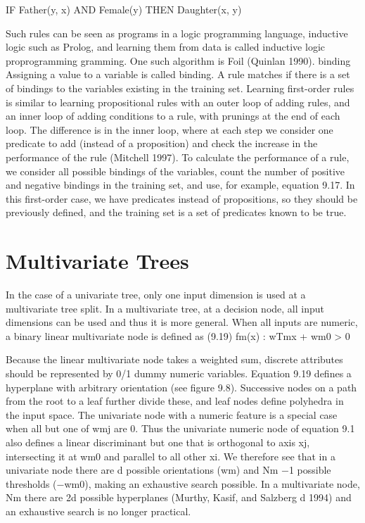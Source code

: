 IF Father(y, x) AND Female(y) THEN Daughter(x, y)

Such rules can be seen as programs in a logic programming language, inductive logic such as Prolog, and learning them from data is called inductive logic proprogramming gramming. One such algorithm is Foil (Quinlan 1990). binding Assigning a value to a variable is called binding. A rule matches if there is a set of bindings to the variables existing in the training set. Learning first-order rules is similar to learning propositional rules with an outer loop of adding rules, and an inner loop of adding conditions to a rule, with prunings at the end of each loop. The difference is in the inner loop, where at each step we consider one predicate to add (instead of a proposition) and check the increase in the performance of the rule (Mitchell 1997). To calculate the performance of a rule, we consider all possible bindings of the variables, count the number of positive and negative bindings in the training set, and use, for example, equation 9.17. In this first-order case, we have predicates instead of propositions, so they should be previously defined, and the training set is a set of predicates known to be true.

\section{Multivariate Trees}

In the case of a univariate tree, only one input dimension is used at a multivariate tree split. In a multivariate tree, at a decision node, all input dimensions can be used and thus it is more general. When all inputs are numeric, a binary linear multivariate node is defined as (9.19) fm(x) : wTmx + wm0 > 0

Because the linear multivariate node takes a weighted sum, discrete attributes should be represented by 0/1 dummy numeric variables. Equation 9.19 defines a hyperplane with arbitrary orientation (see figure 9.8). Successive nodes on a path from the root to a leaf further divide these, and leaf nodes define polyhedra in the input space. The univariate node with a numeric feature is a special case when all but one of wmj are 0. Thus the univariate numeric node of equation 9.1 also defines a linear discriminant but one that is orthogonal to axis xj, intersecting it at wm0 and parallel to all other xi. We therefore see that in a univariate node there are d possible orientations (wm) and Nm $-$1 possible thresholds ($-$wm0), making an exhaustive search possible. In a multivariate node, Nm there are 2d possible hyperplanes (Murthy, Kasif, and Salzberg d 1994) and an exhaustive search is no longer practical.

